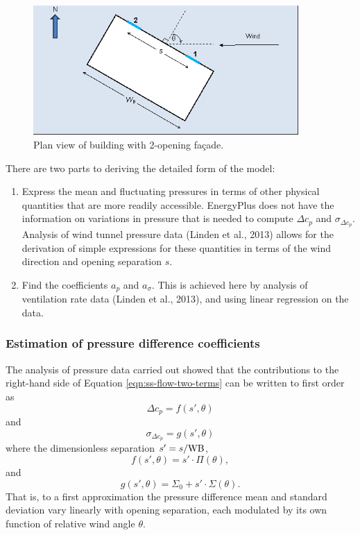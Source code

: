 \begin{figure}[hbtp] %
\centering
\includegraphics[width=0.9\textwidth, height=0.9\textheight, keepaspectratio=true]{media/ss-figure1.png}
\caption{Plan view of building with 2-opening fa\c{c}ade. \protect \label{fig:ss-plan-view-two-openings}}
\end{figure}

There are two parts to deriving the detailed form of the model:
\begin{enumerate}
\item Express the mean and fluctuating pressures in terms of other physical quantities
that are more readily accessible. EnergyPlus does not have the information on variations
in pressure that is needed to compute $\Delta c_p$ and $\sigma_{\Delta c_p}$. Analysis
of wind tunnel pressure data (Linden et al., 2013) allows for the derivation of simple
expressions for these quantities in terms of the wind direction and opening separation
$s$.\label{ss-item-the-first}
\item Find the coefficients $a_p$ and $a_\sigma$. This is achieved here by analysis of
ventilation rate data (Linden et al., 2013), and using linear regression on the
data.\label{ss-item-the-second}
\end{enumerate}

\subsubsection{Estimation of pressure difference coefficients}
The analysis of pressure data carried out showed that the contributions to the
right-hand side of Equation \ref{eqn:ss-flow-two-terms} can be written to first order
as
\begin{equation}
\Delta c_p=f(s',\theta)
\end{equation}
and
\begin{equation}
\sigma_{\Delta c_p}=g(s',\theta)
\end{equation}
where the dimensionless separation $s' = s/\textup{WB}$,
\begin{equation}
f(s',\theta)=s'\cdot\Pi(θ),
\end{equation}
and
\begin{equation}
g(s',\theta)=\Sigma_0+s'\cdot\Sigma(\theta).
\end{equation}
That is, to a first approximation the pressure difference mean and standard deviation vary linearly with opening separation, each modulated by its own function of relative wind angle $\theta$.

